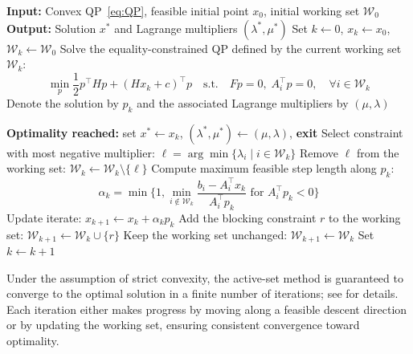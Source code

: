 \documentclass{book}
\theoremstyle{definition}
\newcounter{algorithm_}
\numberwithin{algorithm_}{chapter}
\newcommand{\alglabel}[1]{%
  \refstepcounter{algorithm_}%
  \label{#1}%
}
\begin{document}
\bigskip

\begin{tcolorbox}[colback=gray!10!white, colframe=gray!80!black,
                  title=Algorithm 3.1: Active-Set Method for Convex Quadratic Programming, sharp corners, boxrule=0.8pt]
{\small
\begin{algorithmic}[1]
\State \textbf{Input:} Convex QP~\eqref{eq:QP}, feasible initial point \(x_0\), initial working set \(\mathcal{W}_0\)
\State \textbf{Output:} Solution \(x^*\) and Lagrange multipliers \((\lambda^*,\mu^*)\)
\State Set \(k \gets 0\), \(x_k \gets x_0\), \(\mathcal{W}_k \gets \mathcal{W}_0\)
\Repeat
    \State Solve the equality-constrained QP defined by the current working set \(\mathcal{W}_k\):
    \[
        \min_{p} \frac{1}{2} p^\top H p + (H x_k + c)^\top p
        \quad \text{s.t.} \quad
        F p = 0, \; A_i^\top p = 0, \quad \forall i \in \mathcal{W}_k
    \]
    \State Denote the solution by \(p_k\) and the associated Lagrange multipliers by \((\mu, \lambda)\)
    
            \State \textbf{Optimality reached:} set \(x^* \gets x_k\), \((\lambda^*,\mu^*) \gets (\mu,\lambda)\), \textbf{exit}
        \Else
            \State Select constraint with most negative multiplier:
            \(\ell = \arg\min \{\lambda_i \mid i \in \mathcal{W}_k \}\)
            \State Remove \(\ell\) from the working set: \(\mathcal{W}_k \gets \mathcal{W}_k \setminus \{\ell\}\)
        \EndIf
    \Else
        \State Compute maximum feasible step length along \(p_k\):
        \[
            \alpha_k = \min \Big\{ 1, \min_{i \notin \mathcal{W}_k} 
            \frac{b_i - A_i^\top x_k}{A_i^\top p_k} \text{ for } A_i^\top p_k < 0 \Big\}
        \]
        \State Update iterate: \(x_{k+1} \gets x_k + \alpha_k p_k\)
            \State Add the blocking constraint \(r\) to the working set: \(\mathcal{W}_{k+1} \gets \mathcal{W}_k \cup \{r\}\)
        \Else
            \State Keep the working set unchanged: \(\mathcal{W}_{k+1} \gets \mathcal{W}_k\)
        \EndIf
    \EndIf
    \State Set \(k \gets k+1\)
\end{algorithmic}
}
\end{tcolorbox}
\alglabel{alg:active_set}

\bigskip

Under the assumption of strict convexity, the active-set method is guaranteed to converge to the optimal solution in a finite number of iterations; see \cite{nocedal2006numerical} for details. Each iteration either makes progress by moving along a feasible descent direction or by updating the working set, ensuring consistent convergence toward optimality.
\end{document}
